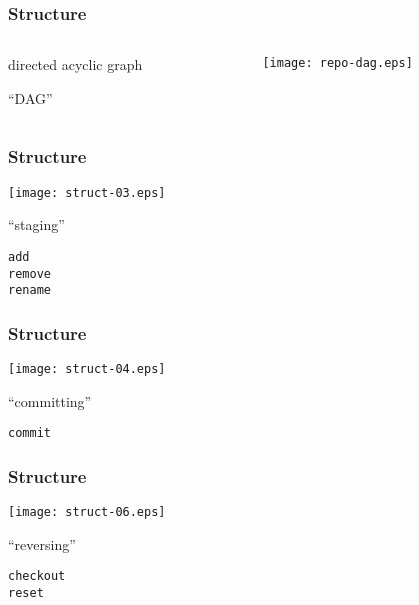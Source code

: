 \documentclass[english]{beamer}
\newcommand{\CMD}[1]{%
\texttt{\textcolor{code-green}{#1}}%
}
\begin{document}
\begin{frame}
\frametitle{Structure}
\begin{columns}[t]
        \begin{column}[T]{.5\textwidth}
                directed acyclic graph

                \vspace{.1\textheight}
                ``DAG''
        \end{column}
        \begin{column}[T]{.5\textwidth}
                \texttt{[image: repo-dag.eps]}
        \end{column}
\end{columns}

\end{frame}

\begin{frame}
\frametitle{Structure}

\texttt{[image: struct-03.eps]}
\vspace{\baselineskip}
\begin{center}
        ``staging''

        \vspace{\baselineskip}
        \CMD{add} \\
        \CMD{remove} \\
        \CMD{rename}
\end{center}
\vspace{\textheight}
\end{frame}

\begin{frame}
\frametitle{Structure}

\texttt{[image: struct-04.eps]}
\vspace{\baselineskip}
\begin{center}
        ``committing''

        \vspace{\baselineskip}
        \CMD{commit}
\end{center}
\vspace{\textheight}
\end{frame}

\begin{frame}
\frametitle{Structure}

\texttt{[image: struct-06.eps]}
\vspace{\baselineskip}
\begin{center}
        ``reversing''

        \vspace{\baselineskip}
        \CMD{checkout} \\
        \CMD{reset}
\end{center}
\vspace{\textheight}
\end{frame}
\end{document}
